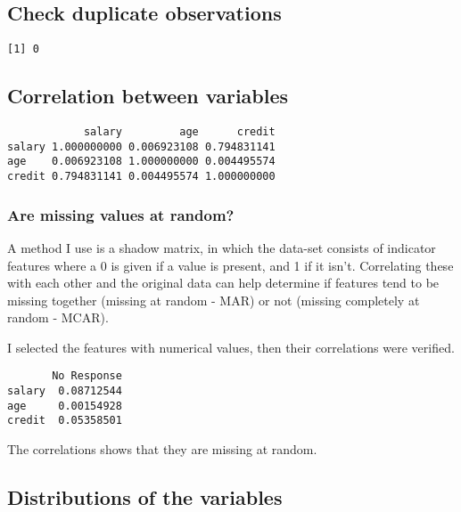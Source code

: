 \documentclass[
]{article}
\begin{document}
\hypertarget{check-duplicate-observations}{%
\subsection{Check duplicate
observations}\label{check-duplicate-observations}}

\begin{verbatim}
[1] 0
\end{verbatim}

\hypertarget{correlation-between-variables}{%
\subsection{Correlation between
variables}\label{correlation-between-variables}}

\begin{verbatim}
            salary         age      credit
salary 1.000000000 0.006923108 0.794831141
age    0.006923108 1.000000000 0.004495574
credit 0.794831141 0.004495574 1.000000000
\end{verbatim}

\hypertarget{are-missing-values-at-random}{%
\subsubsection{Are missing values at
random?}\label{are-missing-values-at-random}}

A method I use is a shadow matrix, in which the data-set consists of
indicator features where a 0 is given if a value is present, and 1 if it
isn't. Correlating these with each other and the original data can help
determine if features tend to be missing together (missing at random -
MAR) or not (missing completely at random - MCAR).

I selected the features with numerical values, then their correlations
were verified.

\begin{verbatim}
       No Response
salary  0.08712544
age     0.00154928
credit  0.05358501
\end{verbatim}

The correlations shows that they are missing at random.

\hypertarget{distributions-of-the-variables}{%
\subsection{Distributions of the
variables}\label{distributions-of-the-variables}}
\end{document}
